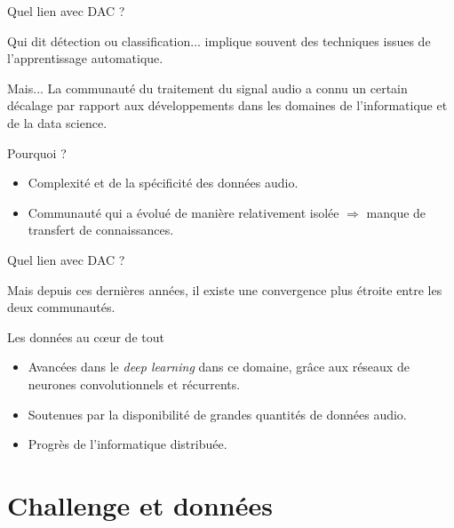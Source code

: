 \documentclass[compress,xcolor=table]{beamer}
\begin{document}
\begin{frame}{Quel lien avec DAC ?}

    Qui dit détection ou classification... implique souvent des techniques issues de l'apprentissage automatique.

    \begin{alertblock}{Mais...}
        La communauté du traitement du signal audio a connu un certain décalage par rapport aux développements dans les domaines de l'informatique et de la data science.
    \end{alertblock}

    \begin{block}{Pourquoi ?}
        \begin{itemize}
            \item Complexité et de la spécificité des données audio.
            \item Communauté qui a évolué de manière relativement isolée $\Rightarrow$ manque de transfert de connaissances.
        \end{itemize}

    \end{block}

\end{frame}

\begin{frame}{Quel lien avec DAC ?}

    Mais depuis ces dernières années, il existe une convergence plus étroite entre les deux communautés.

    \begin{exampleblock}{Les données au c\oe ur de tout}
        \begin{itemize}
            \item Avancées dans le \textit{deep learning} dans ce domaine, grâce aux réseaux de neurones convolutionnels et récurrents.
            \item Soutenues par la disponibilité de grandes quantités de données audio.
            \item Progrès de l'informatique distribuée.
        \end{itemize}
    \end{exampleblock}

\end{frame}

\section{Challenge et données} \subsection{}
\end{document}
